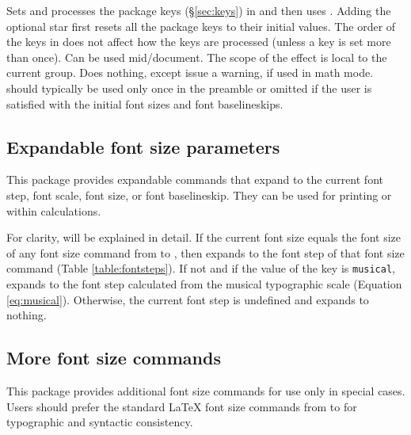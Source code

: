 \documentclass{beery}
\begin{document}
Sets and processes the  package keys (\S\ref{sec:keys}) in  and then uses .
Adding the optional star \sarg{} first resets all the  package keys to their initial values.
The order of the keys in  does not affect how the keys are processed (unless a key is set more than once).
Can be used mid\-/document.
The scope of the effect is local to the current group.
Does nothing, except issue a warning, if used in math mode.
 should typically be used only once in the preamble or omitted if the user is satisfied with the initial font sizes and font baselineskips.

\subsection{Expandable font size parameters}
\label{subsec:expandable}

\begin{mydisplaycode}
  \nopagebreak\newline
  \newline
  \nopagebreak\newline
\end{mydisplaycode}

This package provides expandable commands that expand to the current font step, font scale, font size, or font baselineskip.
They can be used for printing or within calculations.

For clarity,  will be explained in detail.
If the current font size equals the font size of any font size command from  to , then  expands to the font step of that font size command (Table \ref{table:fontsteps}).
If not and if the value of the key  is \texttt{musical},  expands to the font step calculated from the musical typographic scale (Equation \ref{eq:musical}).
Otherwise, the current font step is undefined and  expands to nothing.

\subsection{More font size commands}
\label{subsec:fontsize}

This package provides additional font size commands for use only in special cases.
Users should prefer the standard \LaTeX{} font size commands from  to  for typographic and syntactic consistency.
\end{document}
